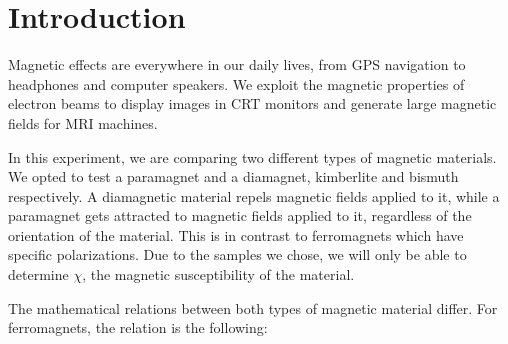 \documentclass[12pt]{article}
\begin{document}
\KimberliteB


\clearpage\maketitle
\thispagestyle{empty}

\pagebreak

\setcounter{page}{1}
\section{Introduction}

Magnetic effects are everywhere in our daily lives, from GPS navigation to headphones and computer speakers. We exploit the magnetic properties of electron beams to display images in CRT monitors and generate large magnetic fields for MRI machines.

In this experiment, we are comparing two different types of magnetic materials. We opted to test a paramagnet and a diamagnet, kimberlite and bismuth respectively. A diamagnetic material repels magnetic fields applied to it, while a paramagnet gets attracted to magnetic fields applied to it, regardless of the orientation of the material. This is in contrast to ferromagnets which have specific polarizations. Due to the samples we chose, we will only be able to determine $\chi$, the magnetic susceptibility of the material.

The mathematical relations between both types of magnetic material differ. For ferromagnets, the relation is the following:
\end{document}
